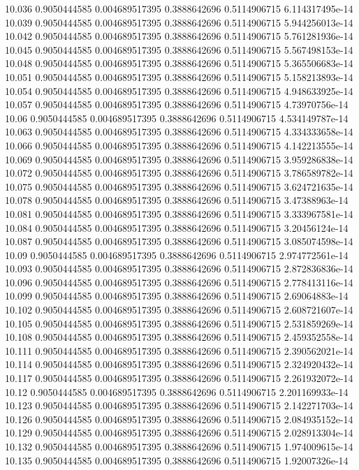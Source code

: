 {10.036 0.9050444585 0.004689517395 0.3888642696 0.5114906715 6.114317495e-14
10.039 0.9050444585 0.004689517395 0.3888642696 0.5114906715 5.944256013e-14
10.042 0.9050444585 0.004689517395 0.3888642696 0.5114906715 5.761281936e-14
10.045 0.9050444585 0.004689517395 0.3888642696 0.5114906715 5.567498153e-14
10.048 0.9050444585 0.004689517395 0.3888642696 0.5114906715 5.365506683e-14
10.051 0.9050444585 0.004689517395 0.3888642696 0.5114906715 5.158213893e-14
10.054 0.9050444585 0.004689517395 0.3888642696 0.5114906715 4.948633925e-14
10.057 0.9050444585 0.004689517395 0.3888642696 0.5114906715 4.73970756e-14
10.06 0.9050444585 0.004689517395 0.3888642696 0.5114906715 4.534149787e-14
10.063 0.9050444585 0.004689517395 0.3888642696 0.5114906715 4.334333658e-14
10.066 0.9050444585 0.004689517395 0.3888642696 0.5114906715 4.142213555e-14
10.069 0.9050444585 0.004689517395 0.3888642696 0.5114906715 3.959286838e-14
10.072 0.9050444585 0.004689517395 0.3888642696 0.5114906715 3.786589782e-14
10.075 0.9050444585 0.004689517395 0.3888642696 0.5114906715 3.624721635e-14
10.078 0.9050444585 0.004689517395 0.3888642696 0.5114906715 3.47388963e-14
10.081 0.9050444585 0.004689517395 0.3888642696 0.5114906715 3.333967581e-14
10.084 0.9050444585 0.004689517395 0.3888642696 0.5114906715 3.20456124e-14
10.087 0.9050444585 0.004689517395 0.3888642696 0.5114906715 3.085074598e-14
10.09 0.9050444585 0.004689517395 0.3888642696 0.5114906715 2.974772561e-14
10.093 0.9050444585 0.004689517395 0.3888642696 0.5114906715 2.872836836e-14
10.096 0.9050444585 0.004689517395 0.3888642696 0.5114906715 2.778413116e-14
10.099 0.9050444585 0.004689517395 0.3888642696 0.5114906715 2.69064883e-14
10.102 0.9050444585 0.004689517395 0.3888642696 0.5114906715 2.608721607e-14
10.105 0.9050444585 0.004689517395 0.3888642696 0.5114906715 2.531859269e-14
10.108 0.9050444585 0.004689517395 0.3888642696 0.5114906715 2.459352558e-14
10.111 0.9050444585 0.004689517395 0.3888642696 0.5114906715 2.390562021e-14
10.114 0.9050444585 0.004689517395 0.3888642696 0.5114906715 2.324920432e-14
10.117 0.9050444585 0.004689517395 0.3888642696 0.5114906715 2.261932072e-14
10.12 0.9050444585 0.004689517395 0.3888642696 0.5114906715 2.201169933e-14
10.123 0.9050444585 0.004689517395 0.3888642696 0.5114906715 2.142271703e-14
10.126 0.9050444585 0.004689517395 0.3888642696 0.5114906715 2.084935152e-14
10.129 0.9050444585 0.004689517395 0.3888642696 0.5114906715 2.028913304e-14
10.132 0.9050444585 0.004689517395 0.3888642696 0.5114906715 1.974009615e-14
10.135 0.9050444585 0.004689517395 0.3888642696 0.5114906715 1.92007326e-14
}
